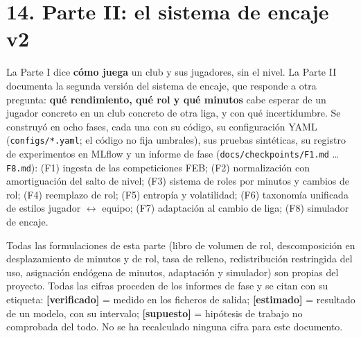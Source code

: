 \documentclass[10pt,a4paper]{article}
\begin{document}
\section*{14. Parte II: el sistema de encaje v2}
La Parte I dice \textbf{cómo juega} un club y sus jugadores, sin el nivel. La Parte II documenta la segunda versión del sistema de encaje, que responde a otra pregunta: \textbf{qué rendimiento, qué rol y qué minutos} cabe esperar de un jugador concreto en un club concreto de otra liga, y con qué incertidumbre. Se construyó en ocho fases, cada una con su código, su configuración YAML (\texttt{configs/\allowbreak{}*.yaml}; el código no fija umbrales), sus pruebas sintéticas, su registro de experimentos en MLflow y un informe de fase (\texttt{docs/\allowbreak{}checkpoints/\allowbreak{}F1.md} \ldots{} \texttt{F8.md}): (F1) ingesta de las competiciones FEB; (F2) normalización con amortiguación del salto de nivel; (F3) sistema de roles por minutos y cambios de rol; (F4) reemplazo de rol; (F5) entropía y volatilidad; (F6) taxonomía unificada de estilos jugador \ensuremath{\leftrightarrow} equipo; (F7) adaptación al cambio de liga; (F8) simulador de encaje.

Todas las formulaciones de esta parte (libro de volumen de rol, descomposición en desplazamiento de minutos y de rol, tasa de relleno, redistribución restringida del uso, asignación endógena de minutos, adaptación y simulador) son propias del proyecto. Todas las cifras proceden de los informes de fase y se citan con su etiqueta: \textbf{[verificado]} = medido en los ficheros de salida; \textbf{[estimado]} = resultado de un modelo, con su intervalo; \textbf{[supuesto]} = hipótesis de trabajo no comprobada del todo. No se ha recalculado ninguna cifra para este documento.
\end{document}
